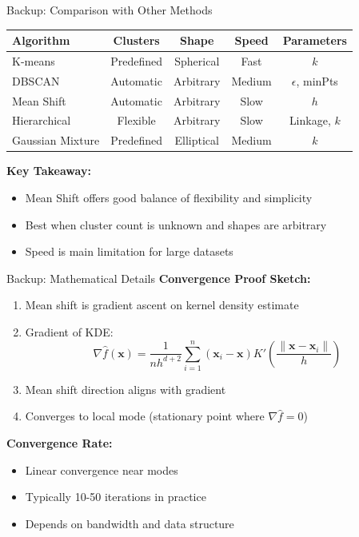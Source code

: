 \begin{frame}{Backup: Comparison with Other Methods}
    \begin{table}
        \centering
        \small
        \begin{tabular}{lcccc}
            \toprule
            \textbf{Algorithm} & \textbf{Clusters} & \textbf{Shape} & \textbf{Speed} & \textbf{Parameters} \\
            \midrule
            K-means & Predefined & Spherical & Fast & $k$ \\
            DBSCAN & Automatic & Arbitrary & Medium & $\epsilon$, minPts \\
            Mean Shift & Automatic & Arbitrary & Slow & $h$ \\
            Hierarchical & Flexible & Arbitrary & Slow & Linkage, $k$ \\
            Gaussian Mixture & Predefined & Elliptical & Medium & $k$ \\
            \bottomrule
        \end{tabular}
    \end{table}

    \vspace{0.5cm}

    \textbf{Key Takeaway:}
    \begin{itemize}
        \item Mean Shift offers good balance of flexibility and simplicity
        \item Best when cluster count is unknown and shapes are arbitrary
        \item Speed is main limitation for large datasets
    \end{itemize}
\end{frame}

\begin{frame}{Backup: Mathematical Details}
    \textbf{Convergence Proof Sketch:}

    \begin{enumerate}
        \item Mean shift is gradient ascent on kernel density estimate
        \item Gradient of KDE:
        \[
        \nabla \hat{f}(\mathbf{x}) = \frac{1}{nh^{d+2}} \sum_{i=1}^{n} (\mathbf{x}_i - \mathbf{x}) K'\left(\frac{\|\mathbf{x} - \mathbf{x}_i\|}{h}\right)
        \]

        \item Mean shift direction aligns with gradient
        \item Converges to local mode (stationary point where $\nabla \hat{f} = 0$)
    \end{enumerate}

    \vspace{0.5cm}

    \textbf{Convergence Rate:}
    \begin{itemize}
        \item Linear convergence near modes
        \item Typically 10-50 iterations in practice
        \item Depends on bandwidth and data structure
    \end{itemize}
\end{frame}
